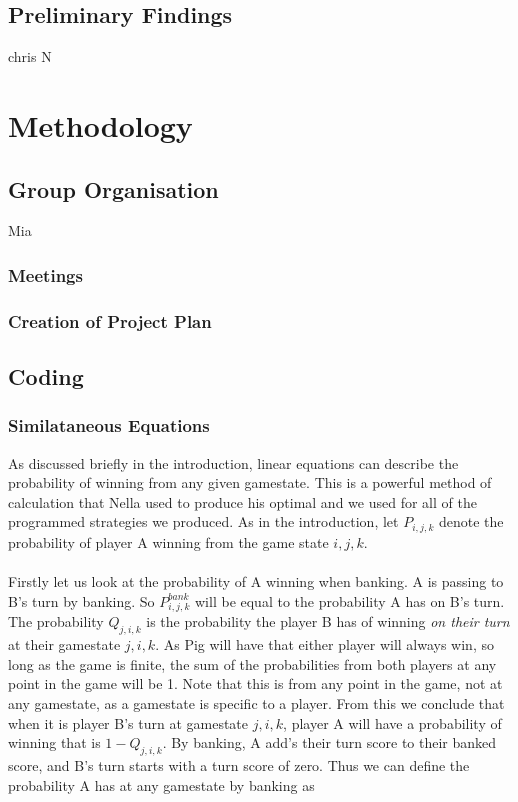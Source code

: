 \documentclass[a4paper,titlepage]{article}
\begin{document}
\subsection{Preliminary Findings}
chris N


\section{Methodology}
\subsection{Group Organisation}
Mia
\subsubsection{Meetings}
\subsubsection{Creation of Project Plan}

\subsection{Coding}
\subsubsection{Similataneous Equations}

As discussed briefly in the introduction, linear equations can describe the probability of winning from any given gamestate.
This is a powerful method of calculation that Nella used to produce his optimal and we used for all of the programmed strategies we produced.
As in the introduction, let $P_{i,j,k}$ denote the probability of player A winning
from the game state $i,j,k$.
\\
\\
Firstly let us look at the probability of A winning when banking.
A is passing to B's turn by banking. So $P^{bank}_{i,j,k}$ will be equal to the probability A has on B's turn.
The probability $Q_{j,i,k}$ is the probability the player B has of winning \textit{on their turn} at their gamestate $j,i,k$.
As Pig will have that either player will always win, so long as the game is finite, the sum of the probabilities from both players at any point in the game will be 1.
Note that this is from any point in the game, not at any gamestate, as a gamestate is specific to a player.
From this we conclude that when it is player B's turn at gamestate $j,i,k$, player A will have a probability of winning that is $1-Q_{j,i,k}$.
By banking, A add's their turn score to their banked score, and B's turn starts with a turn score of zero.
Thus we can define the probability A has at any gamestate by banking as
\end{document}
